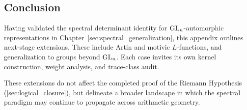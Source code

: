 \subsection*{Conclusion}

Having validated the spectral determinant identity for \( \mathrm{GL}_n \)-automorphic representations in Chapter~\ref{sec:spectral_generalization}, this appendix outlines next-stage extensions. These include Artin and motivic \( L \)-functions, and generalization to groups beyond \( \mathrm{GL}_n \). Each case invites its own kernel construction, weight analysis, and trace-class audit.

\medskip

\noindent
These extensions do not affect the completed proof of the Riemann Hypothesis (\cref{sec:logical_closure}), but delineate a broader landscape in which the spectral paradigm may continue to propagate across arithmetic geometry.
